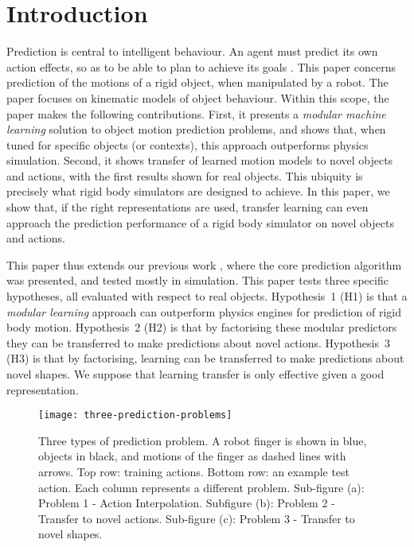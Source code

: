 \section{Introduction}\label{sec:Introduction}

Prediction is central to intelligent behaviour. An agent must predict its own action effects, so as to be able to plan to achieve its goals \citep{craik1967nature}. This paper concerns prediction of the motions of a rigid object, when manipulated by a robot. The paper focuses on kinematic models of object behaviour. Within this scope, the paper makes the following contributions. First, it presents a {\em modular machine learning} solution to object motion prediction problems, and shows that, when tuned for specific objects (or contexts), this approach outperforms physics simulation.  Second, it shows transfer of learned motion models to novel objects and actions, with the first results shown for real objects. This ubiquity is precisely what rigid body simulators are designed to achieve. In this paper, we show that, if the right representations are used, transfer learning can even approach the prediction performance of a rigid body simulator on novel objects and actions.

This paper thus extends our previous work \citep{kopicki_prediction_2010,kopicki-etal-icra11},  where the core prediction algorithm was presented, and tested mostly in simulation.  This paper tests three specific hypotheses, all evaluated with respect to real objects. Hypothesis~1 (H1) is that a {\em modular learning} approach can outperform physics engines for prediction of rigid body motion.  Hypothesis~2 (H2) is that by factorising these modular predictors they can be transferred to make predictions about novel actions. Hypothesis~3 (H3) is that by factorising, learning can be transferred  to make predictions about novel shapes. We suppose that learning transfer is only effective given a good representation.

\def\stackalignment{l}
\begin{figure*}[t!]
\centerline{\texttt{[image: three-prediction-problems]}}
\caption{Three types of prediction problem. A robot finger is shown in blue, objects in black, and motions of the finger as dashed lines with arrows. Top row: training actions. Bottom row: an example test action. Each column represents a different problem. Sub-figure (a): Problem 1 - Action Interpolation. Subfigure (b): Problem 2 - Transfer to novel actions. Sub-figure (c): Problem 3 - Transfer to novel shapes. \label{fig:three-prediction-problems}}
\end{figure*}

